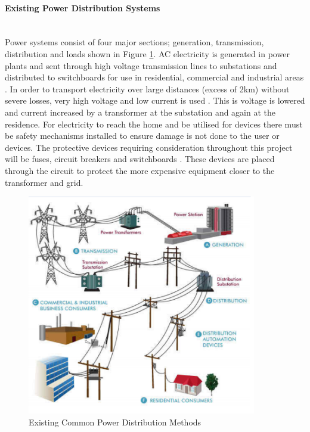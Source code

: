 \paragraph{Existing Power Distribution Systems}
~\\
Power systems consist of four major sections; generation, transmission, distribution and loads shown in Figure \ref{fig:ExistingPower}. AC electricity is generated in power plants and sent through high voltage transmission lines to substations and distributed to switchboards for use in residential, commercial and industrial areas \cite{Amin2011}. In order to transport electricity over large distances (excess of 2km) without severe losses, very high voltage and low current is used \cite{Amin2011}. This is voltage is lowered and current increased by a transformer at the substation and again at the residence. For electricity to reach the home and be utilised for devices there must be safety mechanisms installed to ensure damage is not done to the user or devices. The protective devices requiring consideration throughout this project will be fuses, circuit breakers and switchboards \cite{UnitedStatesDepartmentoftheInterior2000}. These devices are placed through the circuit to protect the more expensive equipment closer to the transformer and grid.  

\begin{figure}[H]
	\hfill\includegraphics[width = 100mm]{images/Power_Distro}\hspace*{\fill}
	\caption{Existing Common Power Distribution Methods \cite{Active2015}}
	\label{fig:ExistingPower}
\end{figure}

